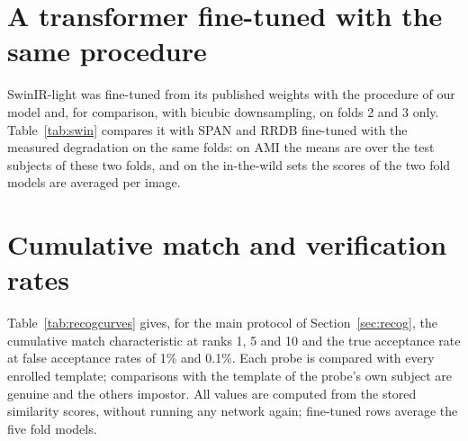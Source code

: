 \section{A transformer fine-tuned with the same procedure}
\label{app:swin}
SwinIR-light was fine-tuned from its published weights with the procedure of our model and, for comparison, with bicubic downsampling, on folds 2 and 3 only. Table~\ref{tab:swin} compares it with SPAN and RRDB fine-tuned with the measured degradation on the same folds: on AMI the means are over the test subjects of these two folds, and on the in-the-wild sets the scores of the two fold models are averaged per image.

\begin{table}[H]
\centering
\caption{PSNR-Y (dB) of SwinIR-light fine-tuned with the procedure of our model, compared with SPAN and RRDB fine-tuned in the same way and with bicubic interpolation, on the test subjects of folds 2 and 3 (AMI, 36-pixel inputs) and on the in-the-wild sets at 24-pixel inputs.}
\label{tab:swin}
\small
{}
\end{table}

\section{Cumulative match and verification rates}
\label{app:curves}
Table~\ref{tab:recogcurves} gives, for the main protocol of Section~\ref{sec:recog}, the cumulative match characteristic at ranks 1, 5 and 10 and the true acceptance rate at false acceptance rates of 1\% and 0.1\%. Each probe is compared with every enrolled template; comparisons with the template of the probe's own subject are genuine and the others impostor. All values are computed from the stored similarity scores, without running any network again; fine-tuned rows average the five fold models.

\begin{table}[H]
\centering
\caption{Cumulative match characteristic (CMC) and true acceptance rate (TAR) at a given false acceptance rate (FAR), in \%, on real small EarVN1.0 probes under the main protocol (Table~\ref{tab:recogall}).}
\label{tab:recogcurves}
\small
{}
\end{table}

